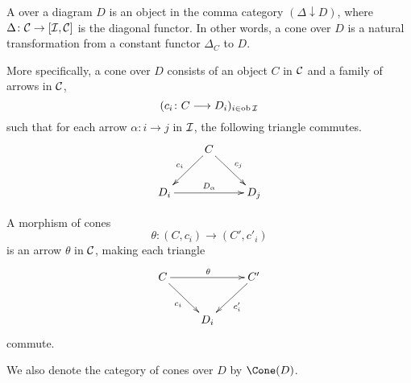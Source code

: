 \begin{defn}
  A  over a diagram $D$ is an object in the comma category $(\Delta\downarrow D)$, where $\Delta\colon{\cal C}\to[{\cal I},{\cal C}]$ is the diagonal functor. In other words, a cone over $D$ is a natural transformation from a constant functor $\Delta_C$ to $D$.

  More specifically, a cone over $D$ consists of an object $C$ in ${\cal C}$ and a family of arrows in ${\cal C}$,
  \begin{equation*}
    (c_i\colon C\longrightarrow D_i)_{i\in\operatorname{ob}{\cal I}}
  \end{equation*}
  such that for each arrow $\alpha\colon i\to j$ in ${\cal I}$, the following triangle commutes.
  \begin{displaymath}
      \xymatrix{
         &C\ar[ld]_{c_i}\ar[rd]^{c_j}&\\
         D_i\ar[rr]^{D_{\alpha}}&&D_j
      }
  \end{displaymath}

  A morphism of cones
  \begin{equation*}
    \theta\colon (C,c_i)\longrightarrow (C',c'_i)
  \end{equation*}
  is an arrow $\theta$ in ${\cal C}$, making each triangle
  \begin{displaymath}
      \xymatrix{
         C\ar[rd]_{c_i}\ar[rr]^{\theta}&&C'\ar[ld]^{c'_i}\\
         &D_i&
      }
  \end{displaymath}
  commute.
\end{defn}
\begin{rem}
  We also denote the category of cones over $D$ by $\Cone(D)$.
\end{rem}

